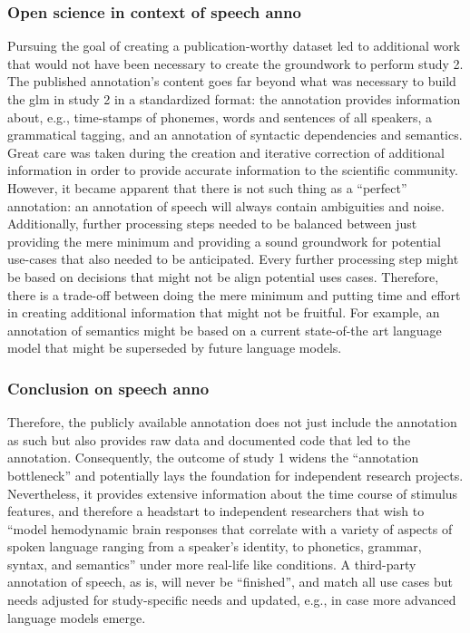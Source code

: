 \subsubsection{Open science in context of speech anno}


Pursuing the goal of creating a publication-worthy dataset led to additional
work that would not have been necessary to create the groundwork to perform
study 2.
The published annotation's content goes far beyond what was necessary to build
the \ac{glm} in study 2 in a standardized format:
%
the annotation provides information about, e.g., time-stamps of phonemes, words
and sentences of all speakers, a grammatical tagging, and an annotation of
syntactic dependencies and semantics.
%
Great care was taken during the creation and iterative correction of additional
information in order to provide accurate information to the scientific
community.
%
However, it became apparent that there is not such thing as a ``perfect''
annotation:
%
an annotation of speech will always contain ambiguities and noise.
%
Additionally, further processing steps needed to be balanced between just
providing the mere minimum and providing a sound groundwork for potential
use-cases that also needed to be anticipated.
%
Every further processing step might be based on decisions that might not be
align potential uses cases.
%
Therefore, there is a trade-off between doing the mere minimum and putting time
and effort in creating additional information that might not be fruitful.
%
For example, an annotation of semantics might be based on a current state-of-the
art language model that might be superseded by future language models.


\subsubsection{Conclusion on speech anno}
%
Therefore, the publicly available annotation does not just include the
annotation as such but also provides raw data and documented code that led to
the annotation.
%
Consequently, the outcome of study 1 widens the ``annotation bottleneck''
\citep{aliko2020naturalistic} and potentially lays the foundation for
independent research projects.
%
Nevertheless, it provides extensive information about the time course of
stimulus features, and therefore a headstart to independent researchers that
wish to ``model hemodynamic brain responses that correlate with a variety of
aspects of spoken language ranging from a speaker's identity, to phonetics,
grammar, syntax, and semantics'' \citep{haeusler2021speechanno} under more
real-life like conditions.
%
A third-party annotation of speech, as is, will never be ``finished'', and match
all use cases but needs adjusted for study-specific needs and updated, e.g., in
case more advanced language models emerge.


